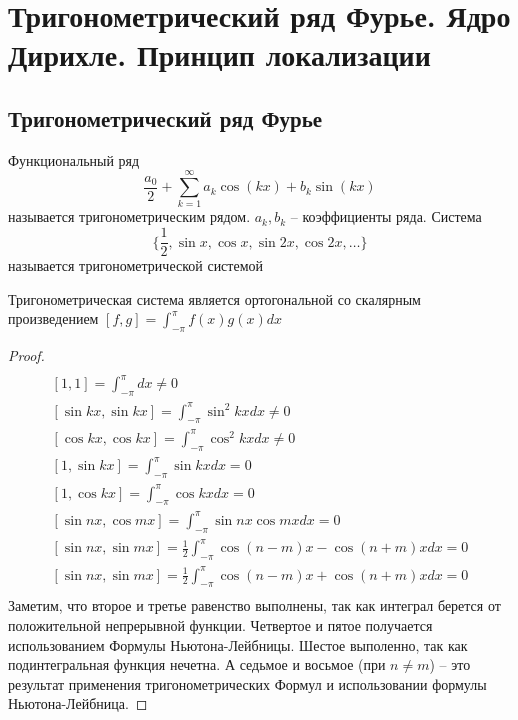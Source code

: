 \documentclass[document.tex]{subfiles}
\begin{document}
\section{Тригонометрический ряд Фурье. Ядро Дирихле. Принцип локализации}
\subsection{Тригонометрический ряд Фурье}
\begin{definition}
	Функциональный ряд
	\begin{equation}
		\label{eq:fourier}
        \frac{a_0}{2} + \sum_{k=1}^{\infty} a_k \cos(kx) + b_k \sin(kx)
	\end{equation} называется тригонометрическим рядом. $a_k, b_k$ -- коэффициенты ряда.
	Система 
    \[
        \{\frac{1}{2}, \sin x, \cos x, \sin 2x, \cos 2x, \ldots\}
    \]
    называется тригонометрической системой
\end{definition}

\begin{statement}
	Тригонометрическая система является ортогональной со скалярным произведением $[f, g] = \int_{-\pi}^{\pi}f(x)g(x)dx$
\end{statement}
\begin{proof}
    \begin{multline*}
        \\
        [1, 1] = \int_{-\pi}^{\pi}dx \neq 0 \\
        [\sin kx, \sin kx] = \int_{-\pi}^{\pi}\sin^2 kx dx \neq 0 \\
        [\cos kx, \cos kx] = \int_{-\pi}^{\pi}\cos^2 kx dx \neq 0 \\
        [1, \sin kx] = \int_{-\pi}^{\pi}\sin kx dx = 0 \\
        [1, \cos kx] = \int_{-\pi}^{\pi}\cos kx dx = 0 \\
        [\sin nx, \cos mx] = \int_{-\pi}^{\pi}\sin nx \cos mx dx = 0 \\
        [\sin nx, \sin mx] = \frac{1}{2} \int_{-\pi}^{\pi}\cos (n - m)x - \cos (n + m)x dx = 0 \\
        [\sin nx, \sin mx] = \frac{1}{2} \int_{-\pi}^{\pi}\cos (n - m)x + \cos (n + m)x dx = 0 \\
    \end{multline*}
    Заметим, что второе и третье равенство выполнены, так как интеграл берется от положительной непрерывной функции.
    Четвертое и пятое получается использованием Формулы Ньютона-Лейбницы. Шестое выполенно, так как подинтегральная
    функция нечетна. А седьмое и восьмое (при $n \neq m$) -- это результат применения тригонометрических Формул и использовании формулы
    Ньютона-Лейбница.
\end{proof}
\end{document}
